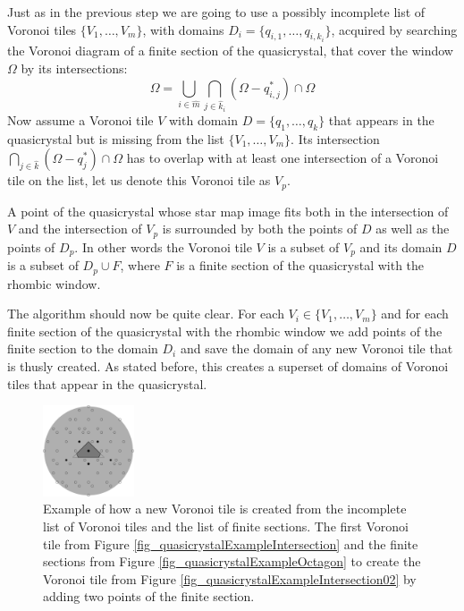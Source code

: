 \documentclass[text.tex]{subfiles}
\begin{document}
Just as in the previous step we are going to use a possibly incomplete list of Voronoi tiles $\{V_1,\dots,V_m\}$, with domains $D_i = \{q_{i,1},\dots,q_{i,k_i}\}$, acquired by searching the Voronoi diagram of a finite section of the quasicrystal, that cover the window $\Omega$ by its intersections:
$$\Omega = \bigcup\limits_{i\in\hat{m}}\bigcap\limits_{j\in\hat{k}_i}(\Omega-q_{i,j}^\ast)\cap\Omega$$ 
Now assume a Voronoi tile $V$ with domain $D = \{q_1,\dots,q_k\}$ that appears in the quasicrystal but is missing from the list $\{V_1,\dots,V_m\}$. Its intersection $\bigcap_{j\in\hat{k}}(\Omega-q_j^\ast)\cap\Omega$ has to overlap with at least one intersection of a Voronoi tile on the list, let us denote this Voronoi tile as $V_p$. 

A point of the quasicrystal whose star map image fits both in the intersection of $V$ and the intersection of $V_p$ is surrounded by both the points of $D$ as well as the points of $D_p$. In other words the Voronoi tile $V$  is a subset of $V_p$ and its domain $D$ is a subset of $D_p\cup F$, where $F$ is a finite section of the quasicrystal with the rhombic window. 

The algorithm should now be quite clear. For each $V_i\in\{V_1,\dots,V_m\}$ and for each finite section of the quasicrystal with the rhombic window we add points of the finite section to the domain $D_i$ and save the domain of any new Voronoi tile that is thusly created. As stated before, this creates a superset of domains of Voronoi tiles that appear in the quasicrystal. 

\begin{figure}[h!]
\centering
\includegraphics[width=0.24\textwidth]{img/2D/cropByFiniteSection}
\caption{Example of how a new Voronoi tile is created from the incomplete list of Voronoi tiles and the list of finite sections. The first Voronoi tile from Figure \ref{fig_quasicrystalExampleIntersection} and the finite sections from Figure \ref{fig_quasicrystalExampleOctagon} to create the Voronoi tile from Figure \ref{fig_quasicrystalExampleIntersection02} by adding two points of the finite section. }
\label{fig_quasicrystalExampleNewTile}
\end{figure}
\end{document}

